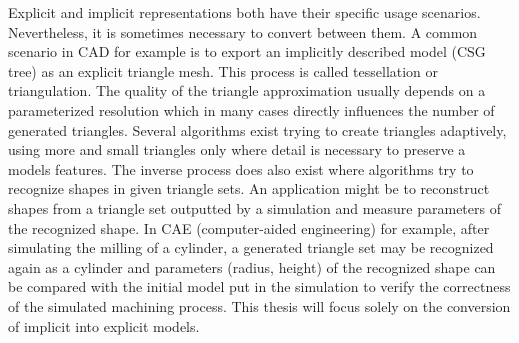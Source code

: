 Explicit and implicit representations both have their specific usage scenarios. Nevertheless, it is sometimes necessary to convert between them.
A common scenario in CAD for example is to export an implicitly described model (\eg CSG tree) as an explicit triangle mesh. This process is called tessellation or triangulation. The quality of the triangle approximation usually depends on a parameterized resolution which in many cases directly influences the number of generated triangles. Several algorithms exist trying to create triangles adaptively, using more and small triangles only where detail is necessary to preserve a models features.
The inverse process does also exist where algorithms try to recognize shapes in given triangle sets. An application might be to reconstruct shapes from a triangle set outputted by a simulation and measure parameters of the recognized shape. In CAE (computer-aided engineering) for example, after simulating the milling of a cylinder, a generated triangle set may be recognized again as a cylinder and parameters (\eg radius, height) of the recognized shape can be compared with the initial model put in the simulation to verify the correctness of the simulated machining process.
This thesis will focus solely on the conversion of implicit into explicit models.